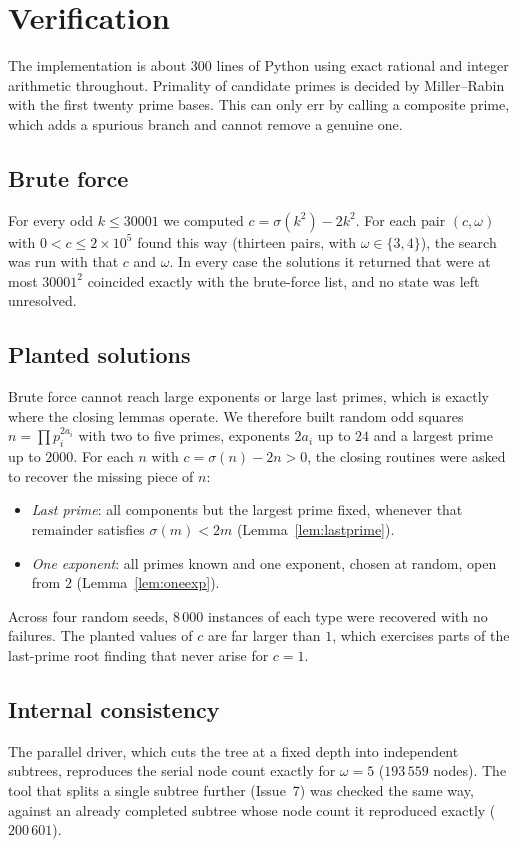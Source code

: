 \documentclass[11pt]{amsart}
\theoremstyle{remark}
\begin{document}
\section{Verification}\label{sec:verification}

The implementation is about 300 lines of Python using exact rational and
integer arithmetic throughout. Primality of candidate primes is decided by
Miller--Rabin with the first twenty prime bases. This can only err by calling a
composite prime, which adds a spurious branch and cannot remove a genuine one.

\subsection{Brute force}
For every odd $k \le 30001$ we computed $c = \sigma(k^2) - 2k^2$. For each pair
$(c, \omega)$ with $0 < c \le 2 \times 10^5$ found this way (thirteen pairs,
with $\omega \in \{3, 4\}$), the search was run with that $c$ and $\omega$.
In every case the solutions it returned that were at most $30001^2$ coincided
exactly with the brute-force list, and no state was left unresolved.

\subsection{Planted solutions}
Brute force cannot reach large exponents or large last primes, which is exactly
where the closing lemmas operate. We therefore built random odd squares
$n = \prod p_i^{2a_i}$ with two to five primes, exponents $2a_i$ up to $24$
and a largest prime up to $2000$. For each $n$ with $c = \sigma(n) - 2n > 0$,
the closing routines were asked to recover the missing piece of $n$:
\begin{itemize}
\item \emph{Last prime}: all components but the largest prime fixed, whenever
  that remainder satisfies $\sigma(m) < 2m$ (Lemma~\ref{lem:lastprime}).
\item \emph{One exponent}: all primes known and one exponent, chosen at
  random, open from $2$ (Lemma~\ref{lem:oneexp}).
\end{itemize}
Across four random seeds, $8\,000$ instances of each type were recovered with
no failures. The planted values of $c$ are far larger than $1$, which
exercises parts of the last-prime root finding that never arise for $c = 1$.

\subsection{Internal consistency}
The parallel driver, which cuts the tree at a fixed depth into independent
subtrees, reproduces the serial node count exactly for $\omega = 5$
($193\,559$ nodes). The tool that splits a single subtree further
(Issue~7) was checked the same way, against an already completed subtree whose
node count it reproduced exactly ($200\,601$).
\end{document}
